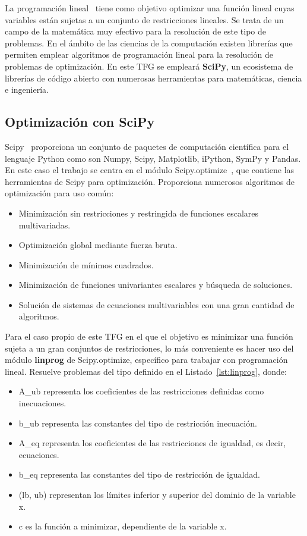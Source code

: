 La programación lineal~\cite{Loom64} tiene como objetivo optimizar una función lineal cuyas variables están sujetas a un conjunto de restricciones lineales.
Se trata de un campo de la matemática muy efectivo para la resolución de este tipo de problemas. En el ámbito de las ciencias de la computación existen librerías que permiten emplear algoritmos de programación lineal para la resolución de problemas de optimización. En este \gls{TFG} se empleará \textbf{SciPy}, un ecosistema de librerías de código abierto con numerosas herramientas para matemáticas, ciencia e ingeniería.

\subsection{Optimización con SciPy}
Scipy~\cite{Scip} proporciona un conjunto de paquetes de computación científica para el lenguaje Python como son Numpy, Scipy, Matplotlib, iPython, SymPy y Pandas. En este caso el trabajo se centra en el módulo Scipy.optimize~\cite{SciOp}, que contiene las herramientas de Scipy para optimización. Proporciona numerosos algoritmos de optimización para uso común:
\begin{itemize}
\item Minimización sin restricciones y restringida de funciones escalares multivariadas.
\item Optimización global mediante fuerza bruta.
\item Minimización de mínimos cuadrados.
\item Minimización de funciones univariantes escalares y búsqueda de soluciones.
\item Solución de sistemas de ecuaciones multivariables con una gran cantidad de algoritmos.
\end{itemize}
Para el caso propio de este \gls{TFG} en el que el objetivo es minimizar una función sujeta a un gran conjuntos de restricciones, lo más conveniente es hacer uso del módulo \textbf{linprog} de Scipy.optimize, específico para trabajar con programación lineal. Resuelve problemas del tipo definido en el Listado~\ref{lst:linprog}, donde:
\begin{itemize}
\item A\_ub representa los coeficientes de las restricciones definidas como inecuaciones.
\item b\_ub representa las constantes del tipo de restricción inecuación.
\item A\_eq representa los coeficientes de las restricciones de igualdad, es decir, ecuaciones.
\item b\_eq representa las constantes del tipo de restricción de igualdad.
\item (lb, ub) representan los límites inferior y superior del dominio de la variable x.
\item c es la función a minimizar, dependiente de la variable x.
\end{itemize}
